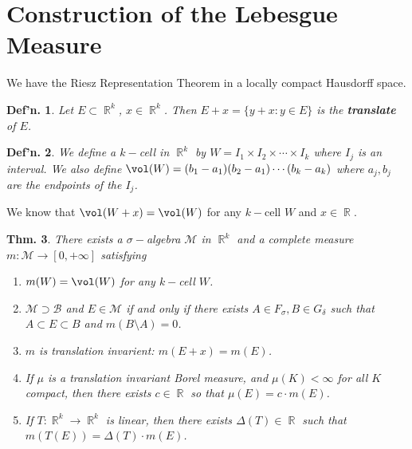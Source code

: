 \documentclass[12pt, a4paper]{book}
\DeclareMathOperator{\R}{\mathbb{R}}
\newtheorem{theorem}{Thm.}[section]
\newtheorem{definition}[theorem]{Def'n.}
\theoremstyle{nonumberplain}
\begin{document}
\section{Construction of the Lebesgue Measure}
We have the Riesz Representation Theorem in a locally compact Hausdorff space.
\begin{definition}
    Let $E\subset\R^k$, $x\in\R^k$.
    Then $E+x=\{y+x:y\in E\}$ is the \textbf{translate} of $E$.
\end{definition}
\begin{definition}
    We define a $k-$cell in $\R^k$ by $W=I_1\times I_2\times\cdots\times I_k$ where $I_j$ is an interval.
    We also define $\vol(W)=(b_1-a_1)(b_2-a_1)\cdots(b_k-a_k)$ where $a_j,b_j$ are the endpoints of the $I_j$.
\end{definition}
We know that $\vol(W+x)=\vol(W)$ for any $k-$cell $W$ and $x\in\R$.
\begin{theorem}
    There exists a $\sigma-$algebra $\mathcal{M}$ in $\R^k$ and a complete measure $m:\mathcal{M}\to[0,+\infty]$ satisfying
    \begin{enumerate}
        \item $m(W)=\vol(W)$ for any $k-$cell $W$.
        \item $\mathcal{M}\supset\mathcal{B}$ and $E\in\mathcal{M}$ if and only if there exists $A\in F_\sigma,B\in G_\delta$ such that $A\subset E\subset B$ and $m(B\setminus A)=0$.
        \item $m$ is translation invarient: $m(E+x)=m(E)$.
        \item If $\mu$ is a translation invariant Borel measure, and $\mu(K)<\infty$ for all $K$ compact, then there exists $c\in\R$ so that $\mu(E)=c\cdot m(E)$.
        \item If $T:\R^k\to\R^k$ is linear, then there exists $\Delta(T)\in\R$ such that $m(T(E))=\Delta(T)\cdot m(E)$.
    \end{enumerate}
\end{theorem}
\end{document}
